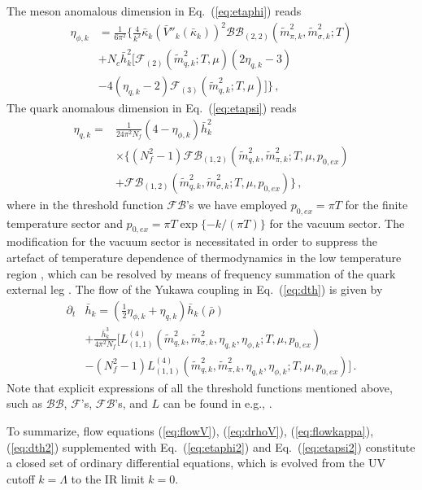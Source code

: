 \documentclass[%
reprint,
superscriptaddress,
showpacs,preprintnumbers,
amsmath,amssymb,
aps,
prd,
]{revtex4-1}
\def\Eq#1{Eq.~(\ref{#1})}
\begin{document}
	The meson anomalous dimension in \Eq{eq:etaphi} reads
	\begin{align}
		\eta_{\phi,k}&=\frac{1}{6\pi^2}\Bigg\{\frac{4}{k^2} \bar{\kappa}_k(\bar{V}''_k(\bar{\kappa}_k))^2\mathcal{BB}_{(2,2)}(\tilde{m}^{2}_{\pi,k},\tilde{m}^{2}_{\sigma,k};T)\nonumber\\[2ex]
		&+N_c\bar{h}^{2}_{k}\bigg[\mathcal{F}_{(2)}(\tilde{m}^{2}_{q,k};T,\mu)(2\eta_{q,k}-3)\nonumber\\[2ex]
		&-4(\eta_{q,k}-2)\mathcal{F}_{(3)}(\tilde{m}^2_{q,k};T,\mu)\bigg]\Bigg\}\,, \label{eq:etaphi2}  
	\end{align} 
	The quark anomalous dimension in \Eq{eq:etapsi} reads
	\begin{align}
		\eta_{q,k}=&\frac{1}{24\pi^2N_f}(4-\eta_{\phi,k})\bar{h}^{2}_{k}\nonumber\\[2ex]
		&\times\bigg\{ (N^{2}_{f}-1)\mathcal{FB}_{(1,2)}(\tilde{m}^{2}_{q,k},\tilde{m}^{2}_{\pi,k};T,\mu,p_{0,ex})\nonumber\\[2ex]
		&+\mathcal{FB}_{(1,2)}(\tilde{m}^{2}_{q,k},\tilde{m}^{2}_{\sigma,k};T,\mu,p_{0,ex})\bigg\}\,, \label{eq:etapsi2}
	\end{align} 
	where in the threshold function $\mathcal{FB}$'s we have employed $p_{0,ex}=\pi T$ for the finite temperature sector and $p_{0,ex}=\pi T\exp\{-k/(\pi T)\}$ for the vacuum sector. The modification for the vacuum sector is necessitated in order to suppress the artefact of temperature dependence of thermodynamics in the low temperature region \cite{Fu:2015naa}, which can be resolved by means of frequency summation of the quark external leg \cite{Fu:2016tey}. The flow of the Yukawa coupling in \Eq{eq:dth} is given by
	\begin{align}
		\partial_t&\bar{h}_k=\left(\frac{1}{2}\eta_{\phi,k}+\eta_{q,k}\right)\bar{h}_k(\bar{\rho})\nonumber\\[2ex]
		&+\frac{\bar{h}^3_k}{4\pi^2N_f}\bigg[L^{(4)}_{(1,1)}(\tilde{m}^{2}_{q,k},\tilde{m}^{2}_{\sigma,k},\eta_{q,k},\eta_{\phi,k};T,\mu,p_{0,ex})\nonumber\\[2ex]
		&-(N^{2}_{f}-1)L^{(4)}_{(1,1)}(\tilde{m}^{2}_{q,k},\tilde{m}^{2}_{\pi,k},\eta_{q,k},\eta_{\phi,k};T,\mu,p_{0,ex})\bigg]\,.\label{eq:dth2}  
	\end{align} 
	Note that explicit expressions of all the threshold functions mentioned above, such as $\mathcal{BB}$, $\mathcal{F}$'s, $\mathcal{FB}$'s, and $L$ can be found in e.g., \cite{Fu:2019hdw,Yin:2019ebz}.
	
	To summarize, flow equations (\ref{eq:flowV}), (\ref{eq:drhoV}), (\ref{eq:flowkappa}), (\ref{eq:dth2}) supplemented with \Eq{eq:etaphi2} and \Eq{eq:etapsi2} constitute a closed set of ordinary differential equations, which is evolved from the UV cutoff $k=\Lambda$ to the IR limit $k=0$. 
	
\end{document}
